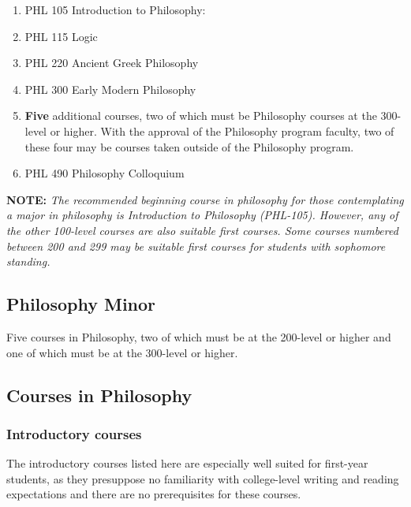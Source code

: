 \documentclass[
  letterpaper,
]{scrbook}
\providecommand{\tightlist}{%
  \setlength{\itemsep}{0pt}\setlength{\parskip}{0pt}}
\begin{document}
\begin{enumerate}
\def\labelenumi{\arabic{enumi}.}
\tightlist
\item
  PHL 105 Introduction to Philosophy:\\
\item
  PHL 115 Logic\\
\item
  PHL 220 Ancient Greek Philosophy\\
\item
  PHL 300 Early Modern Philosophy\\
\item
  \textbf{Five} additional courses, two of which must be Philosophy
  courses at the 300-level or higher. With the approval of the
  Philosophy program faculty, two of these four may be courses taken
  outside of the Philosophy program.\\
\item
  PHL 490 Philosophy Colloquium
\end{enumerate}

\textbf{NOTE:} \emph{The recommended beginning course in philosophy for
those contemplating a major in philosophy is Introduction to Philosophy
(PHL-105). However, any of the other 100-level courses are also suitable
first courses. Some courses numbered between 200 and 299 may be suitable
first courses for students with sophomore standing.}

\subsection{Philosophy Minor}\label{philosophy-minor}

Five courses in Philosophy, two of which must be at the 200-level or
higher and one of which must be at the 300-level or higher.

\subsection{Courses in Philosophy}\label{courses-in-philosophy}

\subsubsection{Introductory courses}\label{introductory-courses}

The introductory courses listed here are especially well suited for
first-year students, as they presuppose no familiarity with
college-level writing and reading expectations and there are no
prerequisites for these courses.
\end{document}
